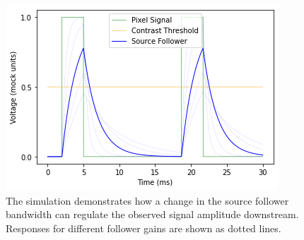 \begin{figure}
    \centering
    \includegraphics[width=.5\textwidth]{chapters/papers/ED/resources/plots/intensity-estimation/source_follower.png}
    \caption[Qualitative Simulation of the Source Follower with an Oscillating Signal]{The simulation demonstrates how a change in the source follower bandwidth can regulate the observed signal amplitude downstream. Responses for different follower gains are shown as dotted lines.}
    \label{fig:sourceFollower}
\end{figure}

% 

